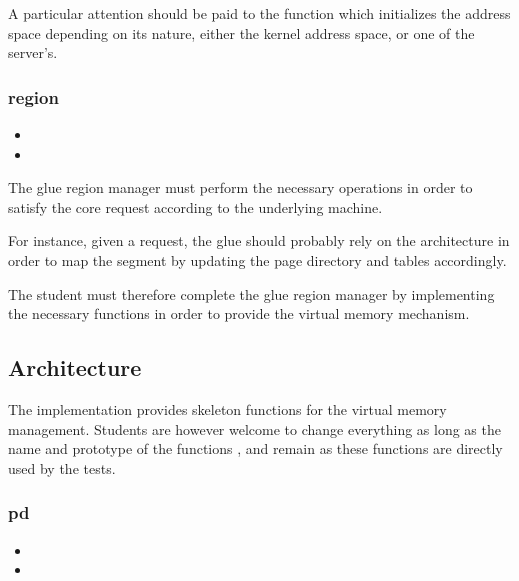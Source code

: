 A particular attention should be paid to the 
function which initializes the address space depending on its nature,
either the kernel address space, or one of the server's.

\subsubsection*{region}

\begin{itemize}
  \item
  \item
\end{itemize}

The glue region manager must perform the necessary operations in order to
satisfy the core request according to the underlying machine.

For instance, given a  request, the glue should
probably rely on the architecture in order to map the segment by updating
the page directory and tables accordingly.

The student must therefore complete the glue region manager by implementing
the necessary functions in order to provide the virtual memory mechanism.

\subsection{Architecture}

The  implementation provides skeleton functions for
the virtual memory management. Students are however welcome to change
everything as long as the name and prototype of the functions
,  and
 remain as these functions are directly
used by the tests.

\subsubsection*{pd}

\begin{itemize}
  \item
  \item
\end{itemize}

